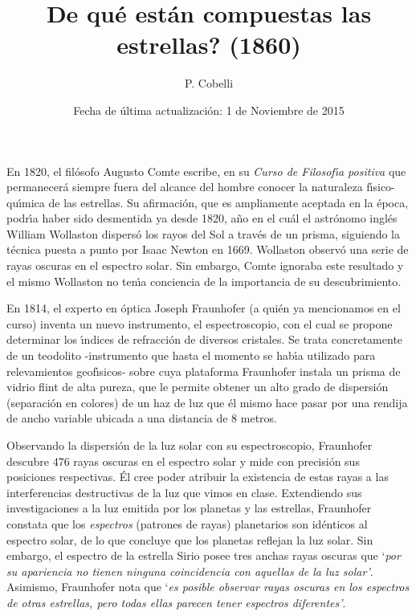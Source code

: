 \documentclass{article}
\begin{document}
\title{De qu\'e est\'an compuestas las estrellas? (1860)}
\author{P. Cobelli}
\date{Fecha de \'ultima actualizaci\'on: 1 de Noviembre de 2015}
\maketitle

En 1820, el fil\'osofo Augusto Comte escribe, en su {\it Curso de
Filosof\'\i a positiva} que permanecer\'a siempre fuera del alcance del
hombre conocer la naturaleza f\'\i sico-qu\'\i mica de las estrellas. Su 
afirmaci\'on, que es ampliamente aceptada en la \'epoca, podr\'\i a haber 
sido desmentida ya desde 1820, a\~no en el cu\'al el astr\'onomo ingl\'es
William Wollaston dispers\'o los rayos del Sol a trav\'es de un prisma,
siguiendo la t\'ecnica puesta a punto por Isaac Newton en 1669. Wollaston
observ\'o una serie de rayas oscuras en el espectro solar. Sin embargo, 
Comte ignoraba este resultado y el mismo Wollaston no ten\'\i a conciencia
de la importancia de su descubrimiento.

En 1814, el experto en \'optica Joseph Fraunhofer (a qui\'en ya mencionamos
en el curso) inventa un nuevo instrumento, el espectroscopio, con el cual 
se propone determinar los \'\i ndices de refracci\'on de diversos cristales.
Se trata concretamente de un teodolito -instrumento que hasta el momento se
hab\'\i a utilizado para relevamientos geof\'\i sicos- sobre cuya plataforma
Fraunhofer instala un prisma de vidrio flint de alta pureza, que le permite
obtener un alto grado de dispersi\'on (separaci\'on en colores) de un haz de 
luz que \'el mismo hace pasar por una rendija de ancho variable ubicada a una 
distancia de 8 metros. 

Observando la dispersi\'on de la luz solar con su espectroscopio, Fraunhofer
descubre 476 rayas oscuras en el espectro solar y mide con precisi\'on sus
posiciones respectivas. \'El cree poder atribuir la existencia de estas rayas
a las interferencias destructivas de la luz que vimos en clase. Extendiendo
sus investigaciones a la luz emitida por los planetas y las estrellas, 
Fraunhofer constata que los {\it espectros} (patrones de rayas) planetarios
son id\'enticos al espectro solar, de lo que concluye que los planetas 
reflejan la luz solar. Sin embargo, el espectro de la estrella Sirio posee
tres anchas rayas oscuras que `{\it por su apariencia no tienen ninguna
coincidencia con aquellas de la luz solar'}. Asimismo, Fraunhofer nota que
`{\it es posible observar rayas oscuras en los espectros de otras estrellas,
pero todas ellas parecen tener espectros diferentes'}. 
\end{document}
